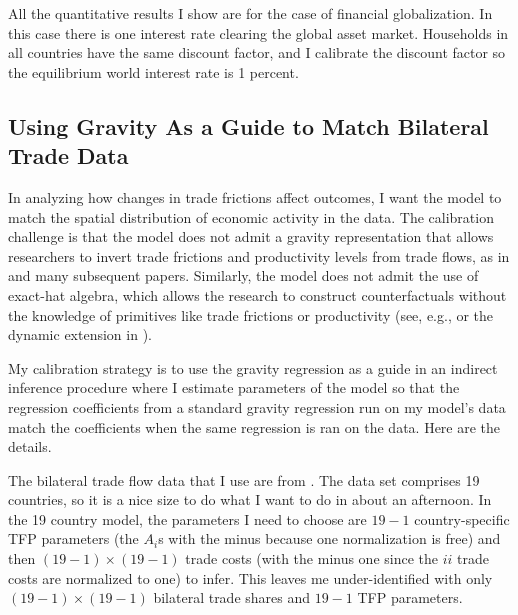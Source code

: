 \documentclass[12pt,pdftex]{article}
\begin{document}
\begin{onehalfspacing}
All the quantitative results I show are for the case of financial globalization. In this case there is one interest rate clearing the global asset market. Households in all countries have the same discount factor, and I calibrate the discount factor so the equilibrium world interest rate is 1 percent.

\subsection{Using Gravity As a Guide to Match Bilateral Trade Data}

In analyzing how changes in trade frictions affect outcomes, I want the model to match the spatial distribution of economic activity in the data. The calibration challenge is that the model does not admit a gravity representation that allows researchers to invert trade frictions and productivity levels from trade flows, as in \citet{eaton2002technology} and many subsequent papers. Similarly, the model does not admit the use of exact-hat algebra, which allows the research to construct counterfactuals without the knowledge of primitives like trade frictions or productivity (see, e.g., \citet{costinot2014trade} or the dynamic extension in \citet{caliendo2015trade}).

My calibration strategy is to use the gravity regression as a guide in an indirect inference procedure where I estimate parameters of the model so that the regression coefficients from a standard gravity regression run on my model's data match the coefficients when the same regression is ran on the data. Here are the details.

The bilateral trade flow data that I use are from \citet{eaton2002technology}. The data set comprises 19 countries, so it is a nice size to do what I want to do in about an afternoon. In the 19 country model, the parameters I need to choose are $19 - 1$ country-specific TFP parameters (the $A_i$s with the minus because one normalization is free) and then $(19-1) \times (19-1)$ trade costs (with the minus one since the $ii$ trade costs are normalized to one) to infer. This leaves me under-identified with  only $(19-1) \times (19-1)$ bilateral trade shares and $19 -1$ TFP parameters.


\end{onehalfspacing}
\end{document}
